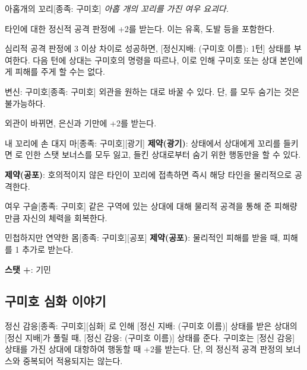 \documentclass{report}
\begin{document}
	\begin{story}{아홉개의 꼬리}{[종족: 구미호]}
		\textit{아홉 개의 꼬리를 가진 여우 요괴다.}
		
		타인에 대한 정신적 공격 판정에 +2를 받는다. 이는 유혹, 도발 등을 포함한다.
		
		심리적 공격 판정에 3 이상 차이로 성공하면, [정신지배: (구미호 이름): 1턴] 상태를 부여한다. 다음 턴에 상대는 구미호의 명령을 따르나, 이로 인해 구미호 또는 상대 본인에게 피해를 주게 할 수는 없다.
		
	\end{story}
	
	\begin{story}{변신: 구미호}{[종족: 구미호]}
		외관을 원하는 대로 바꿀 수 있다. 단, 를 모두 숨기는 것은 불가능하다.
		
		외관이 바뀌면, 은신과 기만에 +2를 받는다.
		
	\end{story}
	
	\begin{story}{내 꼬리에 손 대지 마}{[종족: 구미호][광기]}
		\textbf{제약(광기)}:  상태에서 상대에게 꼬리를 들키면 로 인한 스탯 보너스를 모두 잃고, 들킨 상대로부터 숨기 위한 행동만을 할 수 있다.
		
		\smallskip
		
		\textbf{제약(공포)}: 호의적이지 않은 타인이 꼬리에 접촉하면 즉시 해당 타인을 물리적으로 공격한다.
		
	\end{story}
	
	\begin{story}{여우 구슬}{[종족: 구미호]}
		같은 구역에 있는 상대에 대해 물리적 공격을 통해 준 피해량만큼 자신의 체력을 회복한다.
		
	\end{story}
	
	\begin{story}{민첩하지만 연약한 몸}{[종족: 구미호][공포]}
		\textbf{제약(공포)}: 물리적인 피해를 받을 때, 피해를 1 추가로 받는다.
		
		\smallskip
		
		\textbf{스탯 +}: 기민
		
	\end{story}
	
	\subsection{구미호 심화 이야기}
	
	\begin{story}{정신 감응}{[종족: 구미호][심화]}
		로 인해 [정신 지배: (구미호 이름)] 상태를 받은 상대의 [정신 지배]가 풀릴 때, [정신 감응: (구미호 이름)] 상태를 준다. 구미호는 [정신 감응] 상태를 가진 상대에 대항하여 행동할 때 +2를 받는다. 단, 의 정신적 공격 판정의 보너스와 중복되어 적용되지는 않는다.
		
	\end{story}
	
\end{document}
